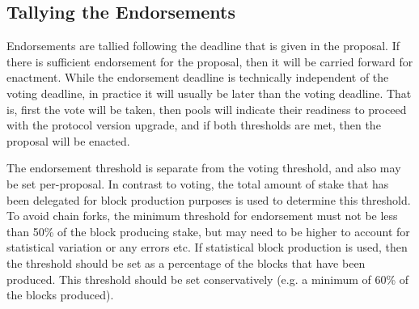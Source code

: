 \subsection{Tallying the Endorsements}

Endorsements are tallied following the deadline that is given in the proposal.
If there is sufficient endorsement for the proposal, then it will be carried
forward for enactment.  While the endorsement deadline is technically
independent of the voting deadline, in practice it will usually be later than the
voting deadline. That is, first the vote will be taken, then pools will indicate
their readiness to proceed with the protocol version upgrade, and if both thresholds are met,
then the proposal will be enacted.

The endorsement threshold is separate from the voting threshold, and also
may be set per-proposal.  %
In contrast to voting, the total amount of stake that has been delegated for block production purposes is used to determine this
threshold. 
To avoid chain forks, the minimum threshold for endorsement must not be less than 50\%
of the block producing stake, but may need to be higher to account for statistical variation or any errors etc.
If statistical block production is used, then the threshold should be set as a percentage of the blocks that have been produced.
This threshold should be set conservatively (e.g. a minimum of 60\% of the blocks produced).
